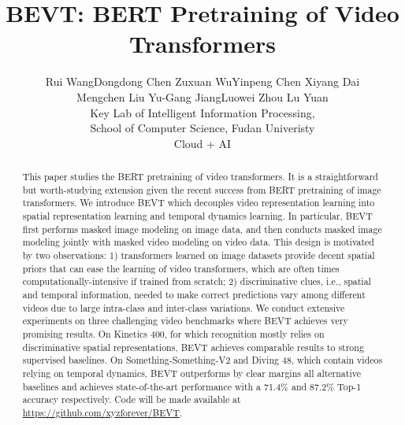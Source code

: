 \documentclass[10pt,twocolumn,letterpaper]{article}
\begin{document}
\title{BEVT: BERT Pretraining of Video Transformers}

\author{Rui Wang\footnotemark[1] \quad Dongdong Chen \quad Zuxuan Wu\footnotemark[2] \quad Yinpeng Chen \quad Xiyang Dai\\ \quad Mengchen Liu \quad Yu-Gang Jiang\footnotemark[2] \quad Luowei Zhou \quad Lu Yuan\\
\normalsizeShanghai Key Lab of Intelligent Information Processing, \\ \normalsize School of Computer Science, Fudan Univeristy\\
\normalsizeMicrosoft Cloud + AI
}
\maketitle

\renewcommand{\thefootnote}{\fnsymbol{footnote}}

\begin{abstract}

This paper studies the BERT pretraining of video transformers. It is a straightforward but worth-studying extension given the recent success from BERT pretraining of image transformers. We introduce BEVT which decouples video representation learning into spatial representation learning and temporal dynamics learning. In particular, BEVT first performs masked image modeling on image data, and then conducts masked image modeling jointly with masked video modeling on video data. This design is motivated by two observations: 
1) transformers learned on image datasets provide decent spatial priors that can ease the learning of video transformers, which are often times computationally-intensive if trained from scratch; 2) discriminative clues, i.e., spatial and temporal information, needed to make correct predictions vary among different videos  due to large intra-class and inter-class variations. We conduct extensive experiments on three challenging video benchmarks where BEVT achieves very promising results. On Kinetics 400, for which recognition mostly relies on discriminative spatial representations, BEVT achieves comparable results to strong supervised baselines. On Something-Something-V2 and Diving 48, which contain videos relying on temporal dynamics, BEVT outperforms by clear margins all alternative baselines and achieves state-of-the-art performance with a 71.4\% and 87.2\% Top-1 accuracy respectively. Code will be made available at \url{https://github.com/xyzforever/BEVT}.
   
\end{abstract}
\end{document}
